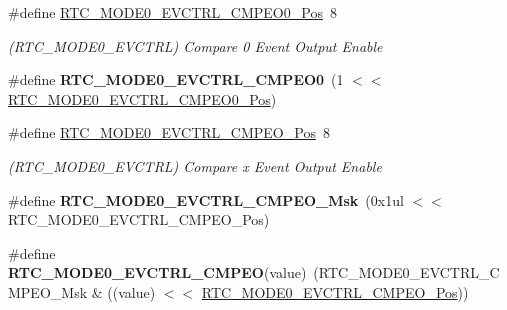 \begin{DoxyCompactItemize}
\item 
\hypertarget{group___s_a_m_l21___r_t_c_ga9dafa714cd6561fd930baa4553f80808}{}\#define \hyperlink{group___s_a_m_l21___r_t_c_ga9dafa714cd6561fd930baa4553f80808}{R\+T\+C\+\_\+\+M\+O\+D\+E0\+\_\+\+E\+V\+C\+T\+R\+L\+\_\+\+C\+M\+P\+E\+O0\+\_\+\+Pos}~8\label{group___s_a_m_l21___r_t_c_ga9dafa714cd6561fd930baa4553f80808}

\begin{DoxyCompactList}\small\item\em (R\+T\+C\+\_\+\+M\+O\+D\+E0\+\_\+\+E\+V\+C\+T\+R\+L) Compare 0 Event Output Enable \end{DoxyCompactList}\item 
\hypertarget{group___s_a_m_l21___r_t_c_gab7d5bedd699e2cb57ce55cf072db67f7}{}\#define {\bfseries R\+T\+C\+\_\+\+M\+O\+D\+E0\+\_\+\+E\+V\+C\+T\+R\+L\+\_\+\+C\+M\+P\+E\+O0}~(1 $<$$<$ \hyperlink{group___s_a_m_l21___r_t_c_ga9dafa714cd6561fd930baa4553f80808}{R\+T\+C\+\_\+\+M\+O\+D\+E0\+\_\+\+E\+V\+C\+T\+R\+L\+\_\+\+C\+M\+P\+E\+O0\+\_\+\+Pos})\label{group___s_a_m_l21___r_t_c_gab7d5bedd699e2cb57ce55cf072db67f7}

\item 
\hypertarget{group___s_a_m_l21___r_t_c_gaa54eec552eccf1c1331181fa7d79db99}{}\#define \hyperlink{group___s_a_m_l21___r_t_c_gaa54eec552eccf1c1331181fa7d79db99}{R\+T\+C\+\_\+\+M\+O\+D\+E0\+\_\+\+E\+V\+C\+T\+R\+L\+\_\+\+C\+M\+P\+E\+O\+\_\+\+Pos}~8\label{group___s_a_m_l21___r_t_c_gaa54eec552eccf1c1331181fa7d79db99}

\begin{DoxyCompactList}\small\item\em (R\+T\+C\+\_\+\+M\+O\+D\+E0\+\_\+\+E\+V\+C\+T\+R\+L) Compare x Event Output Enable \end{DoxyCompactList}\item 
\hypertarget{group___s_a_m_l21___r_t_c_gad4f6fc4333dcbf68bb8c72f1394880e2}{}\#define {\bfseries R\+T\+C\+\_\+\+M\+O\+D\+E0\+\_\+\+E\+V\+C\+T\+R\+L\+\_\+\+C\+M\+P\+E\+O\+\_\+\+Msk}~(0x1ul $<$$<$ R\+T\+C\+\_\+\+M\+O\+D\+E0\+\_\+\+E\+V\+C\+T\+R\+L\+\_\+\+C\+M\+P\+E\+O\+\_\+\+Pos)\label{group___s_a_m_l21___r_t_c_gad4f6fc4333dcbf68bb8c72f1394880e2}

\item 
\hypertarget{group___s_a_m_l21___r_t_c_ga689404e29753441477511449dd56774d}{}\#define {\bfseries R\+T\+C\+\_\+\+M\+O\+D\+E0\+\_\+\+E\+V\+C\+T\+R\+L\+\_\+\+C\+M\+P\+E\+O}(value)~(R\+T\+C\+\_\+\+M\+O\+D\+E0\+\_\+\+E\+V\+C\+T\+R\+L\+\_\+\+C\+M\+P\+E\+O\+\_\+\+Msk \& ((value) $<$$<$ \hyperlink{group___s_a_m_l21___r_t_c_gaa54eec552eccf1c1331181fa7d79db99}{R\+T\+C\+\_\+\+M\+O\+D\+E0\+\_\+\+E\+V\+C\+T\+R\+L\+\_\+\+C\+M\+P\+E\+O\+\_\+\+Pos}))\label{group___s_a_m_l21___r_t_c_ga689404e29753441477511449dd56774d}


\end{DoxyCompactItemize}
